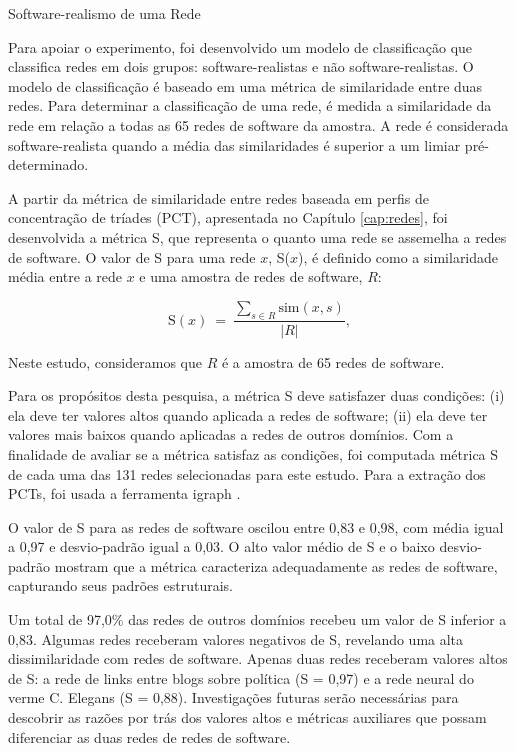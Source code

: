 \begin{section}{Software-realismo de uma Rede} \label{sec:realismo-rede}

Para apoiar o experimento, foi desenvolvido um modelo de classificação que classifica redes em dois grupos: software-realistas e não software-realistas. O modelo de classificação é baseado em uma métrica de similaridade entre duas redes. Para determinar a classificação de uma rede, é medida a similaridade da rede em relação a todas as 65 redes de software da amostra. A rede é considerada software-realista quando a média das similaridades é superior a um limiar pré-determinado.

A partir da métrica de similaridade entre redes baseada em perfis de concentração de tríades (PCT), apresentada no Capítulo \ref{cap:redes}, foi desenvolvida a métrica S, que representa o quanto uma rede se assemelha a redes de software. O valor de S para uma rede $x$, S($x$), é definido como a similaridade média entre a rede $x$ e uma amostra de redes de software, $R$:

$$
\mathrm{S}(x) ~=~ \frac{
\displaystyle\sum_{s \in R} \mathrm{sim}(x, s)
}{|R|} \mathrm{,}
$$

Neste estudo, consideramos que $R$ é a amostra de 65 redes de software.

Para os propósitos desta pesquisa, a métrica S deve satisfazer duas condições: (i) ela deve ter valores altos quando aplicada a redes de software; (ii) ela deve ter valores mais baixos quando aplicadas a redes de outros domínios. Com a finalidade de avaliar se a métrica satisfaz as condições, foi computada métrica S de cada uma das 131 redes selecionadas para este estudo. Para a extração dos PCTs, foi usada a ferramenta igraph \cite{igraph}.

O valor de S para as redes de software oscilou entre 0,83 e 0,98, com média igual a 0,97 e desvio-padrão igual a 0,03. O alto valor médio de S e o baixo desvio-padrão mostram que a métrica caracteriza adequadamente as redes de software, capturando seus padrões estruturais.

Um total de 97,0\% das redes de outros domínios recebeu um valor de S inferior a 0,83. Algumas redes receberam valores negativos de S, revelando uma alta dissimilaridade com redes de software. Apenas duas redes receberam valores altos de S: a rede de links entre blogs sobre política (S = 0,97) e a rede neural do verme C. Elegans (S = 0,88). Investigações futuras serão necessárias para descobrir as razões por trás dos valores altos e métricas auxiliares que possam diferenciar as duas redes de redes de software.


\end{section}
